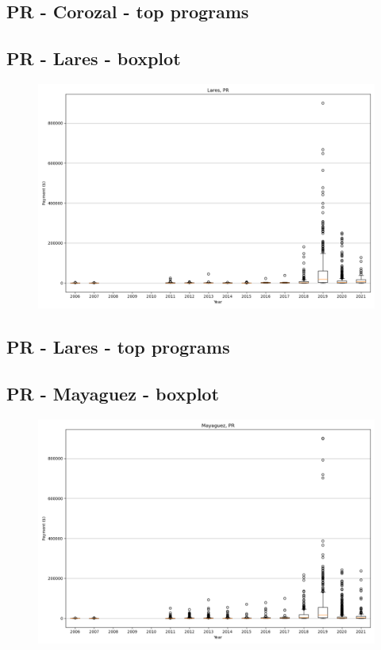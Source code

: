 \subsection*{PR - Corozal - top programs}

\newpage
\subsection*{PR - Lares - boxplot}
\begin{figure}[h]
\centering
\includegraphics[width=7in]{../output/boxplots/counties/Lares-PR_boxplot.png}
\end{figure}


\subsection*{PR - Lares - top programs}

\newpage
\subsection*{PR - Mayaguez - boxplot}
\begin{figure}[h]
\centering
\includegraphics[width=7in]{../output/boxplots/counties/Mayaguez-PR_boxplot.png}
\end{figure}


